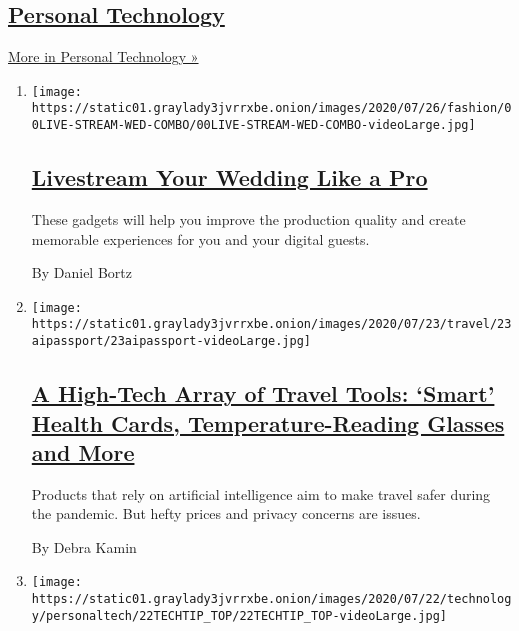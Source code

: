 \hypertarget{personal-technology}{%
\subsection{\texorpdfstring{\href{/section/technology/personaltech}{Personal
Technology}}{Personal Technology}}\label{personal-technology}}

\href{/section/technology/personaltech}{More in Personal Technology »}

\begin{enumerate}
\def\labelenumi{\arabic{enumi}.}
\item
  \texttt{[image: https://static01.graylady3jvrrxbe.onion/images/2020/07/26/fashion/00LIVE-STREAM-WED-COMBO/00LIVE-STREAM-WED-COMBO-videoLarge.jpg]}

  \hypertarget{livestream-your-wedding-like-a-pro}{%
  \subsection{\texorpdfstring{\href{/2020/07/28/fashion/weddings/livestream-your-wedding-like-a-pro.html}{Livestream
  Your Wedding Like a
  Pro}}{Livestream Your Wedding Like a Pro}}\label{livestream-your-wedding-like-a-pro}}

  These gadgets will help you improve the production quality and create
  memorable experiences for you and your digital guests.

  By Daniel Bortz
\item
  \texttt{[image: https://static01.graylady3jvrrxbe.onion/images/2020/07/23/travel/23aipassport/23aipassport-videoLarge.jpg]}

  \hypertarget{a-high-tech-array-of-travel-tools-smart-health-cards-temperature-reading-glasses-and-more}{%
  \subsection{\texorpdfstring{\href{/2020/07/23/travel/artificial-intelligence-coronavirus-passport.html}{A
  High-Tech Array of Travel Tools: `Smart' Health Cards,
  Temperature-Reading Glasses and
  More}}{A High-Tech Array of Travel Tools: `Smart' Health Cards, Temperature-Reading Glasses and More}}\label{a-high-tech-array-of-travel-tools-smart-health-cards-temperature-reading-glasses-and-more}}

  Products that rely on artificial intelligence aim to make travel safer
  during the pandemic. But hefty prices and privacy concerns are issues.

  By Debra Kamin
\item
  \texttt{[image: https://static01.graylady3jvrrxbe.onion/images/2020/07/22/technology/personaltech/22TECHTIP\_TOP/22TECHTIP\_TOP-videoLarge.jpg]}


\end{enumerate}
